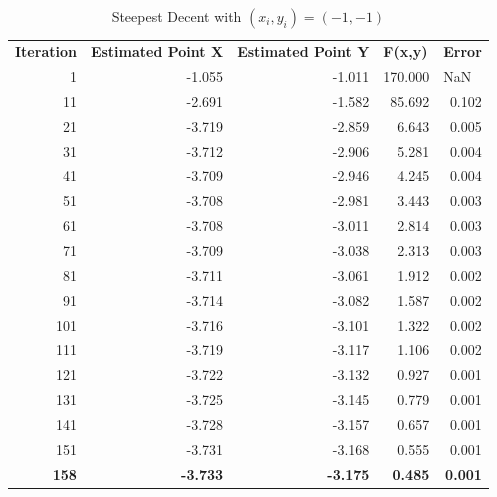 \documentclass[12pt]{article}
\begin{document}
\begin{table}[h!]
  \centering
  \caption{Steepest Decent with $(x_i,y_i) = (-1,-1)$}
    \begin{tabular}{rrrrr}
    \multicolumn{1}{l}{\textbf{Iteration}} & \multicolumn{1}{l}{\textbf{Estimated Point X}} & \multicolumn{1}{l}{\textbf{Estimated Point Y}} & \multicolumn{1}{l}{\textbf{F(x,y)}} & \multicolumn{1}{l}{\textbf{Error}} \\
    1     & -1.055 & -1.011 & 170.000 & \multicolumn{1}{l}{NaN} \\
    11    & -2.691 & -1.582 & 85.692 & 0.102 \\
    21    & -3.719 & -2.859 & 6.643 & 0.005 \\
    31    & -3.712 & -2.906 & 5.281 & 0.004 \\
    41    & -3.709 & -2.946 & 4.245 & 0.004 \\
    51    & -3.708 & -2.981 & 3.443 & 0.003 \\
    61    & -3.708 & -3.011 & 2.814 & 0.003 \\
    71    & -3.709 & -3.038 & 2.313 & 0.003 \\
    81    & -3.711 & -3.061 & 1.912 & 0.002 \\
    91    & -3.714 & -3.082 & 1.587 & 0.002 \\
    101   & -3.716 & -3.101 & 1.322 & 0.002 \\
    111   & -3.719 & -3.117 & 1.106 & 0.002 \\
    121   & -3.722 & -3.132 & 0.927 & 0.001 \\
    131   & -3.725 & -3.145 & 0.779 & 0.001 \\
    141   & -3.728 & -3.157 & 0.657 & 0.001 \\
    151   & -3.731 & -3.168 & 0.555 & 0.001 \\
    \textbf{158} & \textbf{-3.733} & \textbf{-3.175} & \textbf{0.485} & \textbf{0.001} \\
    \end{tabular}%
  \label{tab:SDM_guess4}%
\end{table}%
\end{document}
